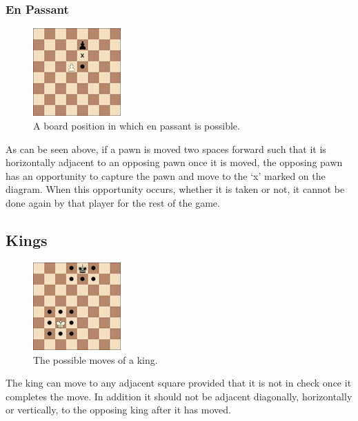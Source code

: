 \subsubsection{En Passant}
\begin{figure}[H]
\centering
	\includegraphics[width=0.3\textwidth]{images/boards/en_passant}
	\caption{A board position in which en passant is possible.}
\end{figure}
As can be seen above, if a pawn is moved two spaces forward such that it is horizontally adjacent to an opposing pawn once it is moved, the opposing pawn has an opportunity to capture the pawn and move to the ‘x' marked on the diagram. When this opportunity occurs, whether it is taken or not, it cannot be done again by that player for the rest of the game.
\subsection{Kings}
\begin{figure}[H]
\centering
	\includegraphics[width=0.3\textwidth]{images/boards/king_movement}
	\caption{The possible moves of a king.}
\end{figure}
The king can move to any adjacent square provided that it is not in check once it completes the move. In addition it should not be adjacent diagonally, horizontally or vertically, to the opposing king after it has moved. 
